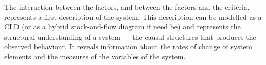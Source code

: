 The interaction between the factors, and between the factors and the
criteria, represents a first description of the system.
%
This description can be modelled as a \acl{CLD} (or as a hybrid stock-and-flow
diagram if need be) and represents the structural understanding of a system ---
the causal structures that produces the observed behaviour.
%
It reveals information about the rates of change of system elements
and the measures of the variables of the system.
%


